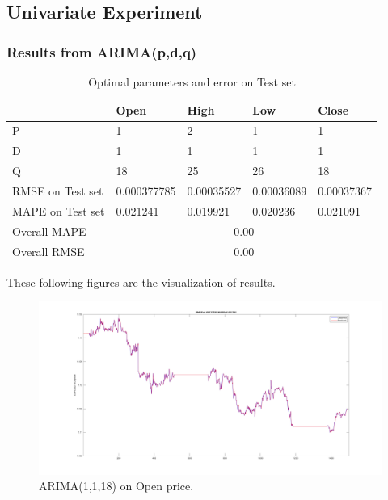 \documentclass[11pt]{article}
\begin{document}
\subsection{Univariate Experiment}
\subsubsection{Results from ARIMA(p,d,q)}

\begin{table}[H]
\begin{tabular}{|l|l|l|l|l|}
  \hline
  & Open        & High       & Low        & Close      \\ \hline
  P                & 1           & 2          & 1          & 1          \\ \hline
  D                & 1           & 1          & 1          & 1          \\ \hline
  Q                & 18          & 25         & 26         & 18         \\ \hline
  RMSE on Test set & 0.000377785 & 0.00035527 & 0.00036089 & 0.00037367 \\ \hline
  MAPE on Test set & 0.021241    & 0.019921   & 0.020236   & 0.021091   \\ \hline
  Overall MAPE     & \multicolumn{4}{c|}{0.00}                          \\ \hline
  Overall RMSE     & \multicolumn{4}{c|}{0.00}                          \\ \hline
\end{tabular}
\caption{Optimal parameters and error on Test set}
\end{table}
These following figures are the visualization of results.
\begin{figure}[H]
  \centering
  \includegraphics[width=\textwidth,keepaspectratio]{figs/arima_1_1_18_open.png}
  \caption{ARIMA(1,1,18) on Open price.}
\end{figure}
\end{document}
